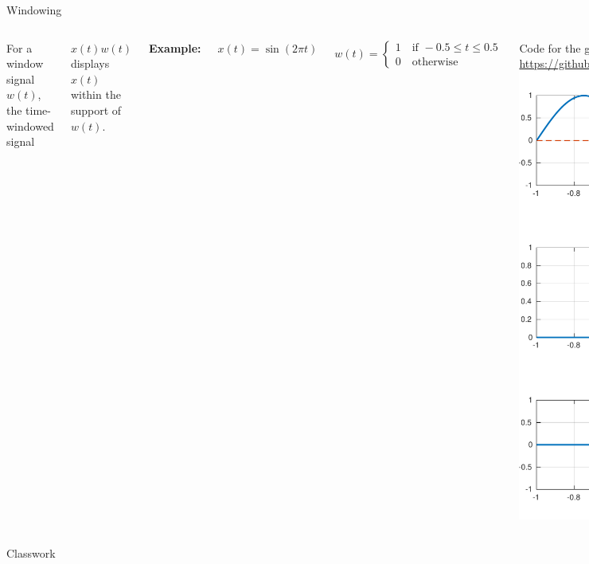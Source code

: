 \documentclass[aspectratio=169,xcolor=dvipsnames,svgnames,x11names,fleqn]{beamer}
\begin{document}
\begin{frame}{Windowing}
   
\begin{columns}
     For a window signal $w(t)$, the time-windowed signal 
     
     $x(t)w(t)$ displays $x(t)$ within the support of $w(t)$.
     
 \textbf{Example:}

    $x(t) = \sin(2\pi t)$

    \begin{equation*}
        w(t) = \begin{cases} 1 \quad \text{if } -0.5 \leq t \leq 0.5 \\ 0 \quad \text{otherwise} \end{cases}
    \end{equation*}

\small

    Code for the graph: \url{https://github.com/rahulbhadani/CPE381_FA25/blob/main/Code/windowing.m}
         \includegraphics[width=0.65\linewidth,trim=0 0 0 0cm,clip]{figures/signal_windowing.pdf}
\end{columns}
   
\end{frame}

\begin{frame}{Classwork}
    
\end{frame}
\end{document}
